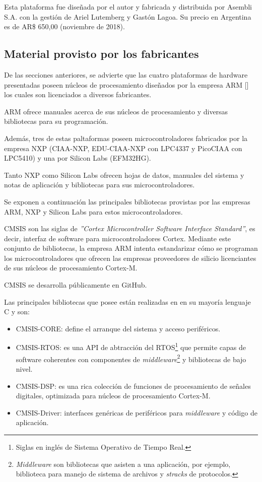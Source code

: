 Esta plataforma fue diseñada por el autor y fabricada y distribuida por Asembli S.A. con la gestión de Ariel Lutemberg y Gastón Lagoa. Su precio en Argentina es de AR\$ 650,00 (noviembre de 2018). 

\subsection{Material provisto por los fabricantes}

De las secciones anteriores, se advierte que las cuatro plataformas de hardware presentadas poseen núcleos de procesamiento diseñados por la empresa ARM [] los cuales son licenciados a diversos fabricantes.

ARM ofrece manuales acerca de sus núcleos de procesamiento y diversas bibliotecas para su programación.

Además, tres de estas paltaformas poseen microcontroladores fabricados por la empresa NXP (CIAA-NXP, EDU-CIAA-NXP con LPC4337 y PicoCIAA con LPC5410) y una por Silicon Labs (EFM32HG). 

Tanto NXP como Silicon Labs ofrecen hojas de datos, manuales del sistema y notas de aplicación y bibliotecas para sus microcontroladores.

Se exponen a continuación las principales bibliotecas provistas por las empresas ARM, NXP y Silicon Labs para estos microcontroladores.


CMSIS son las siglas de \emph{''Cortex Microcontroller Software Interface Standard''}, es decir, interfaz de software para microcontroladores Cortex. Mediante este conjunto de bibliotecas, la empresa ARM intenta estandarizar cómo se programan los microcontroladores que ofrecen las empresas proveedores de silicio licenciantes de sus núcleos de procesamiento Cortex-M. 

CMSIS se desarrolla públicamente en GitHub. 

Las principales bibliotecas que posee están realizadas en en su mayoría lenguaje C y son:

\begin{itemize}
\item
CMSIS-CORE: define el arranque del sistema y acceso periféricos.
\item
CMSIS-RTOS: es una API de abtracción del RTOS\footnote{Siglas en inglés de Sistema Operativo de Tiempo Real.} que permite capas de software coherentes con componentes de \emph{middleware}\footnote{\emph{Middleware} son bibliotecas que asisten a una aplicación, por ejemplo, biblioteca para manejo de sistema de archivos y \emph{stracks} de protocolos.} y bibliotecas de bajo nivel.
\item
CMSIS-DSP: es una rica colección de funciones de procesamiento de señales digitales, optimizada para núcleos de procesamiento Cortex-M.
\item
CMSIS-Driver: interfaces genéricas de periféricos para \emph{middleware} y código de aplicación.
\end{itemize}

